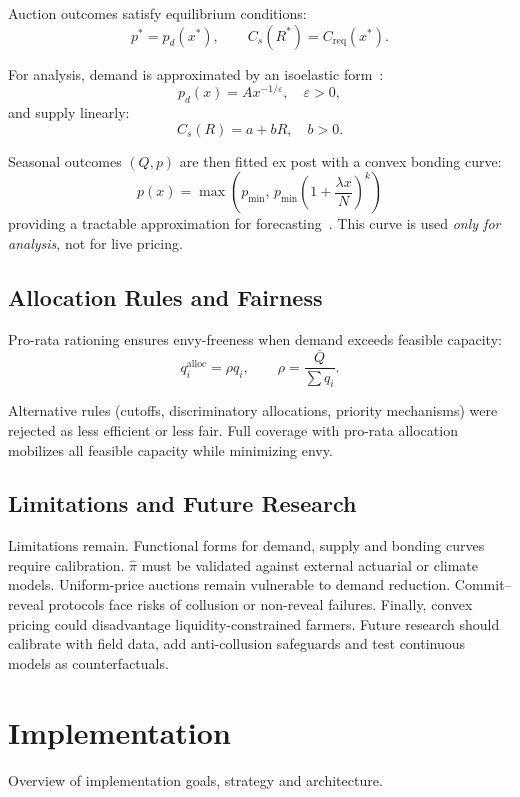 \documentclass[11pt,a4paper]{article}
\begin{document}
		Auction outcomes satisfy equilibrium conditions:
		\[
			p^\ast = p_d(x^\ast), \qquad C_s(R^\ast) = C_{\mathrm{req}}(x^\ast).
		\]

		For analysis, demand is approximated by an isoelastic form~\parencite{mascolell1995microeconomic,varian1992micro}:
		\[
			p_d(x) = A x^{-1/\varepsilon}, \quad \varepsilon > 0,
		\]
		and supply linearly:
		\[
			C_s(R) = a + bR, \quad b > 0.
		\]

		Seasonal outcomes $(Q,p)$ are then fitted ex post with a convex bonding curve:
		\[
			p(x) = \max\left(p_{\min},\, p_{\min}\left(1+\frac{\lambda x}{N}\right)^k\right)
		\]
		providing a tractable approximation for forecasting~\parencite{angeris2020improved,shiller2003bond}.
		This curve is used \emph{only for analysis}, not for live pricing.

		\subsection{Allocation Rules and Fairness}\label{subsec:allocation-rules-and-fairness}

		Pro-rata rationing ensures envy-freeness when demand exceeds feasible capacity:
		\[
			q_i^{\text{alloc}} = \rho q_i, \qquad \rho = \frac{\bar{Q}}{\sum q_i}.
		\]

		Alternative rules (cutoffs, discriminatory allocations, priority mechanisms) were rejected as less efficient or less fair.
		Full coverage with pro-rata allocation mobilizes all feasible capacity while minimizing envy.

		\subsection{Limitations and Future Research}\label{subsec:limitations-and-future-research}

		Limitations remain.
		Functional forms for demand, supply and bonding curves require calibration. $\hat{\pi}$ must be validated against external actuarial or climate models.
		Uniform-price auctions remain vulnerable to demand reduction.
		Commit--reveal protocols face risks of collusion or non-reveal failures.
		Finally, convex pricing could disadvantage liquidity-constrained farmers.
		Future research should calibrate with field data, add anti-collusion safeguards and test continuous models as counterfactuals.


		\section{Implementation}\label{sec:implementation}
		Overview of implementation goals, strategy and architecture.
\end{document}
